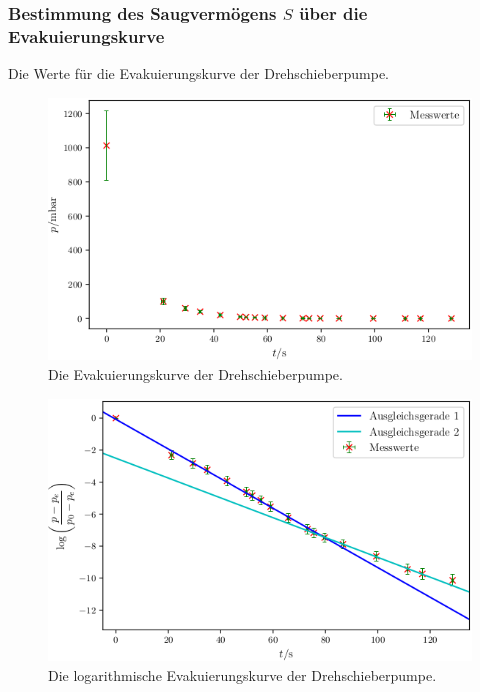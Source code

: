 \subsubsection{Bestimmung des Saugvermögens $S$ über die Evakuierungskurve}

\begin{table}
\centering
\caption{Die Werte für die Evakuierungskurve der Drehschieberpumpe.}

\label{tab:DS}
\end{table}

\begin{figure}
\centering
\includegraphics[width=\linewidth-70pt,height=\textheight-70pt,keepaspectratio]{content/images/DSE.png}
\caption{Die Evakuierungskurve der Drehschieberpumpe.}
\label{fig:DSE}
\end{figure}

\begin{figure}
\centering
\includegraphics[width=\linewidth-70pt,height=\textheight-70pt,keepaspectratio]{content/images/DSL.png}
\caption{Die logarithmische Evakuierungskurve der Drehschieberpumpe.}
\label{fig:DSL}
\end{figure}

